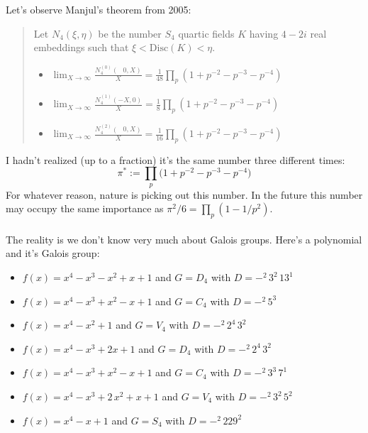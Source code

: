 \documentclass[12pt]{article}
\begin{document}
\noindent Let's observe Manjul's theorem from 2005:
\begin{quotation}
Let $N_4(\xi, \eta)$ be the number $S_4$ quartic fields $K$ having $4-2i$ real embeddings such that $\xi < \mathrm{Disc}(K) < \eta$.
\begin{itemize}
\item $\displaystyle \lim_{X \to \infty} \frac{N_4^{(0)}(\;\;\,0,X)}{X}=
\frac{1}{48}\prod_p (1 + p^{-2} - p^{-3} - p^{-4})$
\item $\displaystyle \lim_{X \to \infty} \frac{N_4^{(1)}(-X,0)}{X}=
\frac{1}{8} \prod_p(1 + p^{-2} - p^{-3} - p^{-4})$
\item $\displaystyle \lim_{X \to \infty} \frac{N_4^{(2)}(\;\;\,0,X)}{X}=
\frac{1}{16} \prod_p (1 + p^{-2} - p^{-3} - p^{-4}) $
\end{itemize}
\end{quotation}
I hadn't realized (up to a fraction) it's the same number three different times:
$$ \pi^* := \prod_p \Big(1 + p^{-2} - p^{-3} - p^{-4} \Big)$$ 
For whatever reason, nature is picking out this number.  In the future this number may occupy the same importance as $\pi^2/6 = \prod_p (1 - 1/p^2)$. \\ \\
The reality is we don't know very much about Galois groups.  Here's a polynomial and it's Galois group:
\begin{itemize}
\item $f(x) = x^4 - x^3 - x^2 + x + 1 $ and $G = D_4 $ \hspace{1em} with $D = -^2 \,3^2 \,13^1 $
\item $f(x) = x^4 - x^3 + x^2 - x + 1 $ and $G = C_4 $ \hspace{1.1em} with $D = -^2 \, 5^3 $
\item $f(x) = x^4 - x^2 + 1 $ and $G = V_4 $ \hspace{5.2em} with $D = -^2 \, 2^4 \, 3^2 $
\item $f(x) = x^4 - x^3 + 2 x + 1 $ and $G = D_4 $ \hspace{2.5em} with $D = -^2 \, 2^4 \, 3^2 $
\item $f(x) = x^4 - x^3 + x^2 - x + 1 $ and $G = C_4 $ \hspace{1em} with $D = -^2 \, 3^3 \, 7^1 $
\item $f(x) = x^4 - x^3 + 2\,x^2 + x + 1 $ and $G = V_4 $ \hspace{0.5em} with $D = -^2 \, 3^2 \, 5^2 $
\item $f(x) = x^4 - x + 1 $ and $G = S_4 $ with $D = -^2 \, 229^2 $
\end{itemize}
\end{document}
